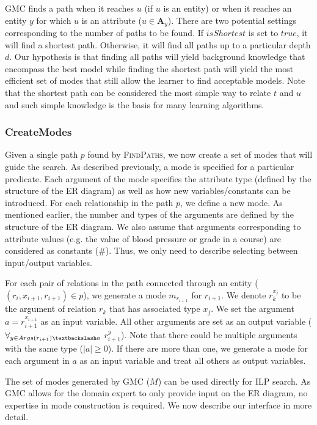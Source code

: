 \documentclass[sigconf]{acmart}
\begin{document}
\textsc{GMC} finds a path when it reaches $u$ (if $u$ is an entity) or when it reaches an entity $y$ for which $u$ is an attribute ($u \in \mathbf{A}_y $). There are two potential settings corresponding to the number of paths to be found. If $isShortest$ is set to $true$, it will find a shortest path. Otherwise, it will find all paths up to a particular depth $d$. Our hypothesis is that finding all paths will yield background knowledge that encompass the best model while finding the shortest path will yield the most efficient set of modes that still allow the learner to find acceptable models. Note that the shortest path can be considered the most simple way to relate $t$ and $u$ and such simple knowledge is the basis for many learning algorithms.

\subsubsection{CreateModes}
Given a single path $p$ found by \textsc{FindPaths}, we now create a set of modes that will guide the search. As described previously, a mode is specified for a particular predicate. Each argument of the mode specifies the attribute type (defined by the structure of the ER diagram) as well as how new variables/constants can be introduced. For each relationship in the path $p$, we define a new mode. As mentioned earlier, the number and types of the arguments are defined by the structure of the ER diagram. We also assume that arguments corresponding to attribute values (e.g. the value of blood pressure or grade in a course) are considered as constants (\#). Thus, we only need to describe selecting between input/output variables.

For each pair of relations in the path connected through an entity ($(r_i,x_{i+1},r_{i+1})\in p$), we generate a mode $m_{r_{i+1}}$ for $r_{i+1}$. We denote $r^{x_{j}}_{k}$ to be the argument of relation $r_{k}$ that has associated type $x_{j}$. We set the argument $a=r^{x_{i+1}}_{i+1}$ as an input variable. All other arguments are set as an output variable ($\forall_{y\in Args(r_{i+1})\textbackslash a}$ $r^{y}_{i+1}$). Note that there could be multiple arguments with the same type ($|a|\geq 0$). If there are more than one, we generate a mode for each argument in $a$ as an input variable and treat all others as output variables.

The set of modes generated by \textsc{GMC} ($M$) can be used directly for ILP search. As \textsc{GMC} allows for the domain expert to only provide input on the ER diagram, no expertise in mode construction is required. We now describe our interface in more detail.
\end{document}
